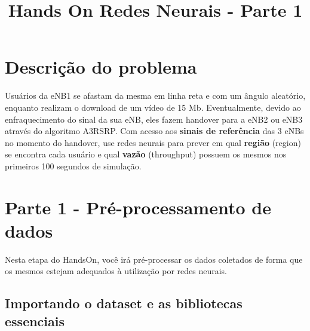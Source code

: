 \documentclass[11pt]{article}
\title{Hands On Redes Neurais - Parte 1}
\begin{document}
    
    
    \maketitle
    
    

    
    \hypertarget{descriuxe7uxe3o-do-problema}{%
\section{Descrição do problema}\label{descriuxe7uxe3o-do-problema}}

Usuários da eNB1 se afastam da mesma em linha reta e com um ângulo
aleatório, enquanto realizam o download de um vídeo de 15 Mb.
Eventualmente, devido ao enfraquecimento do sinal da sua eNB, eles fazem
handover para a eNB2 ou eNB3 através do algoritmo A3RSRP. Com acesso aos
\textbf{sinais de referência} das 3 eNBs no momento do handover, use
redes neurais para prever em qual \textbf{região} (region) se encontra
cada usuário e qual \textbf{vazão} (throughput) possuem os mesmos nos
primeiros 100 segundos de simulação. 

    \hypertarget{parte-1---pruxe9-processamento-de-dados}{%
\section{Parte 1 - Pré-processamento de
dados}\label{parte-1---pruxe9-processamento-de-dados}}

Nesta etapa do HandsOn, você irá pré-processar os dados coletados de
forma que os mesmos estejam adequados à utilização por redes neurais.

\hypertarget{importando-o-dataset-e-as-bibliotecas-essenciais}{%
\subsection{Importando o dataset e as bibliotecas
essenciais}\label{importando-o-dataset-e-as-bibliotecas-essenciais}}
\end{document}
